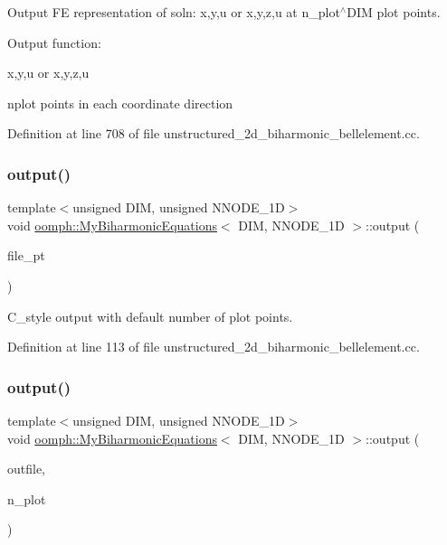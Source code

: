 Output FE representation of soln\+: x,y,u or x,y,z,u at n\+\_\+plot$^\wedge$\+D\+IM plot points. 

Output function\+:

x,y,u or x,y,z,u

nplot points in each coordinate direction 

Definition at line 708 of file unstructured\+\_\+2d\+\_\+biharmonic\+\_\+bellelement.\+cc.

\mbox{\label{classoomph_1_1MyBiharmonicEquations_a2ee8f210f50cf3b43f2b31b5e16b704f}} 
\subsubsection{\texorpdfstring{output()}{output()}\hspace{0.1cm}{\footnotesize\ttfamily [4/8]}}
{\footnotesize\ttfamily template$<$unsigned D\+IM, unsigned N\+N\+O\+D\+E\+\_\+1D$>$ \\
void \hyperlink{classoomph_1_1MyBiharmonicEquations}{oomph\+::\+My\+Biharmonic\+Equations}$<$ D\+IM, N\+N\+O\+D\+E\+\_\+1D $>$\+::output (\begin{DoxyParamCaption}\item[{F\+I\+LE $\ast$}]{file\+\_\+pt }\end{DoxyParamCaption})\hspace{0.3cm}{\ttfamily [inline]}}



C\+\_\+style output with default number of plot points. 



Definition at line 113 of file unstructured\+\_\+2d\+\_\+biharmonic\+\_\+bellelement.\+cc.

\mbox{\label{classoomph_1_1MyBiharmonicEquations_a9a2734695e94f83eb6d553a7090dbebd}} 
\subsubsection{\texorpdfstring{output()}{output()}\hspace{0.1cm}{\footnotesize\ttfamily [5/8]}}
{\footnotesize\ttfamily template$<$unsigned D\+IM, unsigned N\+N\+O\+D\+E\+\_\+1D$>$ \\
void \hyperlink{classoomph_1_1MyBiharmonicEquations}{oomph\+::\+My\+Biharmonic\+Equations}$<$ D\+IM, N\+N\+O\+D\+E\+\_\+1D $>$\+::output (\begin{DoxyParamCaption}\item[{std\+::ostream \&}]{outfile,  }\item[{const unsigned \&}]{n\+\_\+plot }\end{DoxyParamCaption})}



